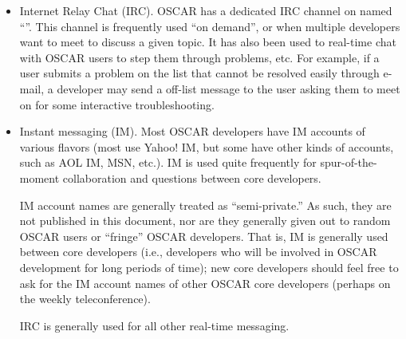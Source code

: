 \begin{itemize}
\item Internet Relay Chat (IRC).  OSCAR has a dedicated IRC channel on
   named
  ``''.  This channel is frequently used
  ``on demand'', or when multiple developers want to meet to discuss a
  given topic.  It has also been used to real-time chat with OSCAR
  users to step them through problems, etc.  For example, if a user
  submits a problem on the  list that cannot be
  resolved easily through e-mail, a developer may send a off-list
  message to the user asking them to meet on
   for some interactive troubleshooting.
  
\item Instant messaging (IM).  Most OSCAR developers have IM accounts
  of various flavors (most use Yahoo! IM, but some have other kinds of
  accounts, such as AOL IM, MSN, etc.).  IM is used quite frequently
  for spur-of-the-moment collaboration and questions between core
  developers.  
  
  IM account names are generally treated as ``semi-private.''  As
  such, they are not published in this document, nor are they
  generally given out to random OSCAR users or ``fringe'' OSCAR
  developers.  That is, IM is generally used between core developers
  (i.e., developers who will be involved in OSCAR development for long
  periods of time); new core developers should feel free to ask for
  the IM account names of other OSCAR core developers (perhaps on the
  weekly teleconference).

  IRC is generally used for all other real-time messaging.
\end{itemize}
